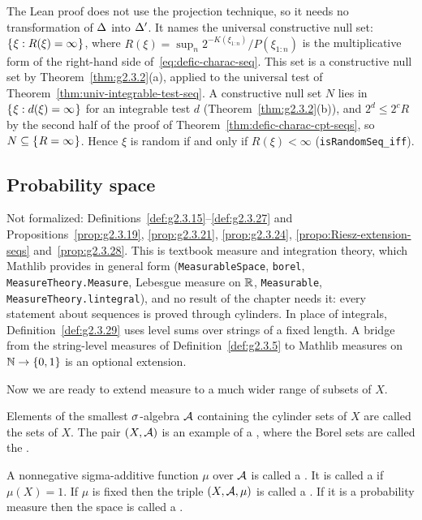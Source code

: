 \begin{formalization}
The Lean proof does not use the projection technique, so it needs no transformation of
\( \Delta \) into \( \Delta' \). It names the universal constructive null set:
\( \mathopen\{\mskip 1mu\xi : R(\xi) = \infty\mskip 1mu\mathclose\} \), where
\( R(\xi) = \sup_{n} 2^{-K(\xi_{1:n})}/P(\xi_{1:n}) \) is the multiplicative form of the
right-hand side of~\eqref{eq:defic-charac-seq}. This set is a constructive null set by
Theorem~\ref{thm:g2.3.2}(a), applied to the universal test of
Theorem~\ref{thm:univ-integrable-test-seq}. A constructive null set \( N \) lies in
\( \mathopen\{\mskip 1mu\xi : d(\xi) = \infty\mskip 1mu\mathclose\} \) for an integrable test \( d \)
(Theorem~\ref{thm:g2.3.2}(b)), and \( 2^{d} \le 2^{c} R \) by the second half of the proof of
Theorem~\ref{thm:defic-charac-cpt-seqs}, so \( N \subseteq \mathopen\{\mskip 1mu R = \infty\mskip 1mu\mathclose\} \). Hence \( \xi \)
is random if and only if \( R(\xi) < \infty \) (\texttt{isRandomSeq\_iff}).
\end{formalization}

\subsection{Probability space}

\begin{formalization}
Not formalized: Definitions~\ref{def:g2.3.15}--\ref{def:g2.3.27} and
Propositions~\ref{prop:g2.3.19}, \ref{prop:g2.3.21}, \ref{prop:g2.3.24},
\ref{propo:Riesz-extension-seqs} and~\ref{prop:g2.3.28}. This is textbook measure and
integration theory, which Mathlib provides in general form (\texttt{MeasurableSpace},
\texttt{borel}, \texttt{MeasureTheory.Measure}, Lebesgue measure on \( \mathbb{R} \),
\texttt{Measurable}, \texttt{MeasureTheory.lintegral}), and no result of the chapter needs
it: every statement about sequences is proved through cylinders. In place of integrals,
Definition~\ref{def:g2.3.29} uses level sums over strings of a fixed length. A bridge from
the string-level measures of Definition~\ref{def:g2.3.5} to Mathlib measures on
\( \mathbb{N} \to \{0,1\} \) is an optional extension.
\end{formalization}

Now we are ready to extend measure to a much wider range of subsets of \( X \).

\begin{definition}
  \label{def:g2.3.15}
  \notready
 Elements of the smallest \( \sigma \)-algebra \( \mathcal{A} \) containing the cylinder sets of \( X \) are
called the  sets of \( X \).
The pair \( (X,\mathcal{A}) \) is an example of a , where the Borel
sets are called the .

A nonnegative sigma-additive function \( \mu \) over \( \mathcal{A} \) is called a .
It is called a  if \( \mu(X)=1 \).
If \( \mu \) is fixed then the triple \( (X,\mathcal{A},\mu) \) is called a .
If it is a probability measure then the space is called a .
\end{definition}

